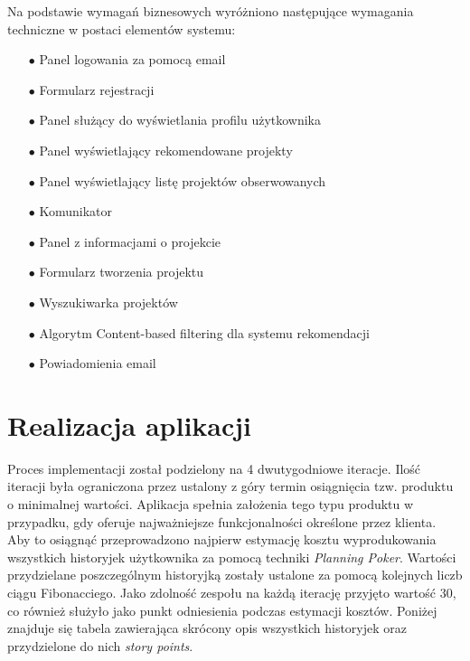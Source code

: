 Na podstawie wymagań biznesowych wyróżniono następujące wymagania techniczne w postaci elementów systemu:
\begin{itemize}
	\item[$\bullet$] Panel logowania za pomocą email
	\item[$\bullet$] Formularz rejestracji
	\item[$\bullet$] Panel służący do wyświetlania profilu użytkownika
	\item[$\bullet$] Panel wyświetlający rekomendowane projekty
	\item[$\bullet$] Panel wyświetlający listę projektów obserwowanych
	\item[$\bullet$] Komunikator
	\item[$\bullet$] Panel z informacjami o projekcie
	\item[$\bullet$] Formularz tworzenia projektu
	\item[$\bullet$] Wyszukiwarka projektów
	\item[$\bullet$] Algorytm Content-based filtering dla systemu rekomendacji
	\item[$\bullet$] Powiadomienia email
\end{itemize}

\section{Realizacja aplikacji}

Proces implementacji został podzielony na 4 dwutygodniowe iteracje. Ilość iteracji była ograniczona przez ustalony z góry termin osiągnięcia tzw. produktu o minimalnej wartości. Aplikacja spełnia założenia tego typu produktu w przypadku, gdy oferuje najważniejsze funkcjonalności określone przez klienta. Aby to osiągnąć przeprowadzono najpierw estymację kosztu wyprodukowania wszystkich historyjek użytkownika za pomocą techniki \textit{Planning Poker}. Wartości przydzielane poszczególnym historyjką zostały ustalone za pomocą kolejnych liczb ciągu Fibonacciego. Jako zdolność zespołu na każdą iterację przyjęto wartość 30, co również służyło jako punkt odniesienia podczas estymacji kosztów. Poniżej znajduje się tabela zawierająca skrócony opis wszystkich historyjek oraz przydzielone do nich \textit{story points}.


